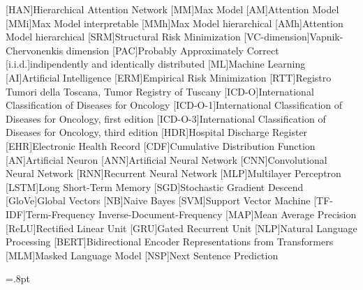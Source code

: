 [HAN]{Hierarchical Attention Network}
[MM]{Max Model}
[AM]{Attention Model}
[MMi]{Max Model interpretable}
[MMh]{Max Model hierarchical}
[AMh]{Attention Model hierarchical}
[SRM]{Structural Risk Minimization}
[VC-dimension]{Vapnik-Chervonenkis dimension}
[PAC]{Probably Approximately Correct}
[i.i.d.]{indipendently and identically distributed}
[ML]{Machine Learning}
[AI]{Artificial Intelligence}
[ERM]{Empirical Risk Minimization}
[RTT]{Registro Tumori della Toscana, Tumor Registry of Tuscany}
[ICD-O]{International Classification of Diseases for Oncology}
[ICD-O-1]{International Classification of Diseases for Oncology, first edition}
[ICD-O-3]{International Classification of Diseases for Oncology, third edition}
[HDR]{Hospital Discharge Register}
[EHR]{Electronic Health Record}
[CDF]{Cumulative Distribution Function}
[AN]{Artificial Neuron}
[ANN]{Artificial Neural Network}
[CNN]{Convolutional Neural Network}
[RNN]{Recurrent Neural Network}
[MLP]{Multilayer Perceptron}
[LSTM]{Long Short-Term Memory}
[SGD]{Stochastic Gradient Descend}
[GloVe]{Global Vectors}
[NB]{Naive Bayes}
[SVM]{Support Vector Machine}
[TF-IDF]{Term-Frequency Inverse-Document-Frequency}
[MAP]{Mean Average Precision}
[ReLU]{Rectified Linear Unit}
[GRU]{Gated Recurrent Unit}
[NLP]{Natural Language Processing}
[BERT]{Bidirectional Encoder Representations from Transformers}
[MLM]{Masked Language Model}
[NSP]{Next Sentence Prediction}

\newcommand\floatwidth{0.9\textwidth}
\newcommand\attTableIcdoWidth{2.5cm}
\newcommand\attTableTextWidth{10cm}
\newlength\lunderset
\newlength{}
\lunderset=1.7pt\relax
{}=.8pt\relax
\def\stackalignment{l}
\newcommand\att[4][1]{\setbox0=\hbox{#2}%
  \stackunder[#1\lunderset-\rulethick]{\strut#2}{\color{#3!#4}\rule{\wd0}{\rulethick}}}

\newcommand{\attvisB}[3]{\tikz[overlay]\node[fill=att!#2,inner sep=1pt, anchor=text, rectangle, rounded corners=1mm,draw=attb!#3] {#1};\phantom{#1}}

